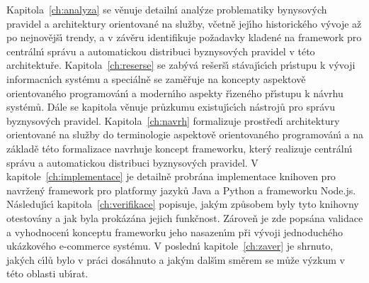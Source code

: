 Kapitola~\ref{ch:analyza} se věnuje detailn\'{\i} anal\'yze problematiky bynysov\'ych pravidel a
architektury orientované na služby, včetně jej\'{\i}ho historického v\'yvoje až po nejnovějš\'{\i} trendy,
a v závěru identifikuje požadavky kladené na framework pro centráln\'{\i} správu a
automatickou distribuci byznysov\'ych pravidel v této architektuře. Kapitola~\ref{ch:reserse}
se zab\'yvá rešerš\'{\i} stávaj\'{\i}c\'{\i}ch pr\'{\i}stupu k v\'yvoji informacn\'{\i}ch systému a speciálně se zaměřuje
na koncepty aspektově orientovaného programován\'{\i} a modern\'{\i}ho aspekty ř\'{\i}zeného př\'{\i}stupu k návrhu
systémů. Dále se kapitola věnuje průzkumu existuj\'{\i}c\'{\i}ch nástrojů pro správu byznysov\'ych pravidel.
Kapitola~\ref{ch:navrh} formalizuje prostřed\'{\i} architektury orientované na služby do terminologie
aspektově orientovaného programován\'{\i} a na základě této formalizace navrhuje koncept frameworku,
kter\'y realizuje centráln\'{\i} správu a automatickou distribuci byznysov\'ych pravidel.
V kapitole~\ref{ch:implementace} je detailně probrána implementace knihoven pro navržen\'y framework
pro platformy jazyků Java a Python a frameworku Node.js. Následuj\'{\i}c\'{\i} kapitola~\ref{ch:verifikace}
popisuje, jak\'ym způsobem byly tyto knihovny otestovány a jak byla prokázána jejich funkčnost. Zároveň
je zde popsána validace a vyhodnocen\'{\i} konceptu frameworku jeho nasazen\'{\i}m při v\'yvoji
jednoduchého ukázkového e-commerce systému. V posledn\'{\i} kapitole~\ref{ch:zaver} je shrnuto, jak\'ych
c\'{\i}lů bylo v práci dosáhnuto a jak\'ym dalš\'{\i}m směrem se může v\'yzkum v této oblasti ub\'{\i}rat.
